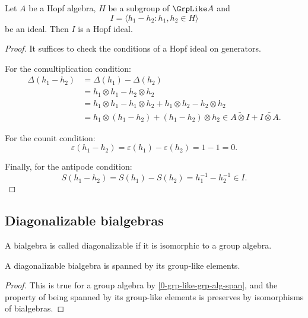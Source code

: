 \begin{proposition}
  \label{0-grp-like-quot-hopf}

  Let $A$ be a Hopf algebra, $H$ be a subgroup of $\GrpLike A$ and
  \[
    I = \langle h_1 - h_2 : h_1,h_2 \in H \rangle
  \]
  be an ideal. Then $I$ is a Hopf ideal.
\end{proposition}
\begin{proof}
  \uses{}

  It suffices to check the conditions of a Hopf ideal on generators.

  For the comultiplication condition:
  \begin{align*}
    \Delta(h_1-h_2) &= \Delta(h_1) - \Delta(h_2) \\
    &= h_1 \otimes h_1 - h_2 \otimes h_2 \\
    &= h_1 \otimes h_1 - h_1 \otimes h_2 + h_1 \otimes h_2 - h_2 \otimes h_2 \\
    &= h_1 \otimes (h_1 - h_2) + (h_1 - h_2) \otimes h_2 \in \bar{A \otimes I} + \bar{I \otimes A}.
  \end{align*}

  For the counit condition:
  \[
    \varepsilon(h_1 - h_2) = \varepsilon(h_1) - \varepsilon(h_2) = 1 - 1 = 0.
  \]

  Finally, for the antipode condition:
  \[
    S(h_1 - h_2) = S(h_1) - S(h_2) = h_1^{-1} - h_2^{-1} \in I.
  \]
\end{proof}


\subsection{Diagonalizable bialgebras}


\begin{definition}
  \label{0-is-diag-bialg}
  \uses{}
  \leanok

  A bialgebra is called diagonalizable if it is isomorphic to a group algebra.
\end{definition}


\begin{lemma}
  \label{0-is-diag-bialg-group-like-span}
  \leanok

  A diagonalizable bialgebra is spanned by its group-like elements.
\end{lemma}
\begin{proof}
  \leanok

  This is true for a group algebra by \ref{0-grp-like-grp-alg-span}, and the
  property of being spanned by its group-like elements is preserves by
  isomorphisms of bialgebras.
\end{proof}


